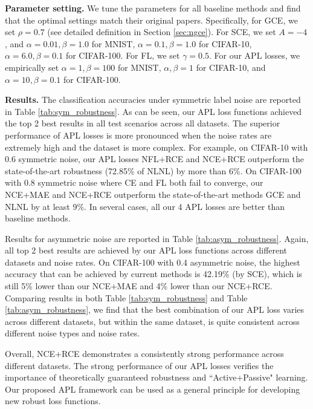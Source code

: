 \documentclass{article}
\begin{document}
\noindent\textbf{Parameter setting.}
We tune the parameters for all baseline methods and find that the optimal settings match their original papers. Specifically, for GCE, we set $\rho=0.7$ (see detailed definition in Section \ref{sec:ngce}). For SCE, we set $A = -4$, and $\alpha = 0.01, \beta = 1.0$ for MNIST, $\alpha = 0.1, \beta = 1.0$ for CIFAR-10, $\alpha = 6.0, \beta = 0.1$ for CIFAR-100. For FL, we set $\gamma=0.5$. For our APL losses, we empirically set $\alpha = 1, \beta = 100$ for MNIST, $\alpha,\beta = 1$ for CIFAR-10, and $\alpha = 10, \beta = 0.1$ for CIFAR-100.

\noindent\textbf{Results.} The classification accuracies under symmetric label noise are reported in Table \ref{tab:sym_robustness}.
As can be seen, our APL loss functions achieved the top 2 best results in all test scenarios across all datasets. 
The superior performance of APL losses is more pronounced when the noise rates are extremely high and the dataset is more complex. For example, on CIFAR-10 with 0.6 symmetric noise, our APL losses NFL+RCE and NCE+RCE outperform the state-of-the-art robustness (72.85\% of NLNL) by more than 6\%.
On CIFAR-100 with 0.8 symmetric noise where CE and FL both fail to converge, our NCE+MAE and NCE+RCE outperform the state-of-the-art methods GCE and NLNL by at least 9\%. In several cases, all our 4 APL losses are better than baseline methods.

Results for asymmetric noise are reported in Table \ref{tab:asym_robustness}. Again, all top 2 best results are achieved by our APL loss functions across different datasets and noise rates. On CIFAR-100 with 0.4 asymmetric noise, the highest accuracy that can be achieved by current methods is 42.19\% (by SCE), which is still 5\% lower than our NCE+MAE and 4\% lower than our NCE+RCE. Comparing results in both Table \ref{tab:sym_robustness} and Table \ref{tab:asym_robustness}, we find that the best combination of our APL loss varies across different datasets, but within the same dataset, is quite consistent across different noise types and noise rates.


Overall, NCE+RCE demonstrates a consistently strong performance across different datasets. 
The strong performance of our APL losses verifies the importance of theoretically guaranteed robustness and ``Active+Passive" learning.
Our proposed APL framework can be used as a general principle for developing new robust loss functions.
\end{document}
